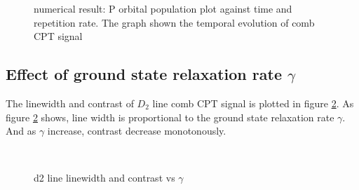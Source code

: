 \documentclass[11pt,a4paper]{article}
\begin{document}
\begin{figure}[H]
  \centering
  \caption{numerical result: P orbital population plot against time and repetition rate. The graph shown the temporal evolution of comb CPT signal}
  \label{fig:small_system_result}
\end{figure}

\subsection{Effect of ground state relaxation rate $\gamma$}
The linewidth and contrast of $D_2$ line comb CPT signal is plotted in figure \ref{fig:gamma_relation}. As figure \ref{fig:gamma_relation} shows, line width is proportional to the ground state relaxation rate $\gamma$. And as $\gamma$ increase, contrast decrease monotonously. %
\begin{figure}[H]
  \centering
  \\
  \caption{d2 line linewidth and contrast vs $\gamma$}
  \label{fig:gamma_relation}
\end{figure}
\end{document}
